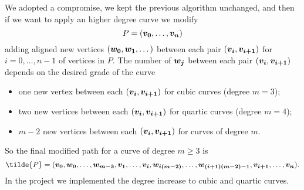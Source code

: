\documentclass[dissertation.tex]{subfiles}
\begin{document}
We adopted a compromise, we kept the previous algorithm unchanged, and
then if we want to apply an higher degree \bs curve we modify 
\begin{equation*}
P=(\boldsymbol{v_0},\dots,\boldsymbol{v_n})  
\end{equation*}
adding aligned new vertices $(\boldsymbol{w_0},\boldsymbol{w_1},\dots)$ between each pair
$(\boldsymbol{v_i},\boldsymbol{v_{i+1}})$ for $i=0,\dots,n-1$ of vertices in $P$. The
number of $\boldsymbol{w_j}$
between each pair $(\boldsymbol{v_i},\boldsymbol{v_{i+1}})$ depends on the desired
grade of the curve
\begin{itemize}
\item one new vertex between each $(\boldsymbol{v_i},\boldsymbol{v_{i+1}})$ for cubic
  \bs curves (degree $m=3$);
\item two new vertices between each $(\boldsymbol{v_i},\boldsymbol{v_{i+1}})$ for quartic
  \bs curves (degree $m=4$);
\item $m-2$ new vertices between each $(\boldsymbol{v_i},\boldsymbol{v_{i+1}})$ for
  \bs curves of degree $m$.
\end{itemize}
So the final modified path for a \bs curve of degree $m\ge 3$ is
\begin{equation*}
  \tilde{P}=(\ve{v_0},\ve{w_0},\dots,\ve{w_{m-3}},\ve{v_1},\dots,\ve{v_i},\ve{w_{i(m-2)}},\dots,\ve{w_{(i+1)(m-2)-1}},\ve{v_{i+1}},\dots,\ve{v_n}).
\end{equation*}
In the project we implemented the degree increase to cubic and quartic
curves.
\end{document}

